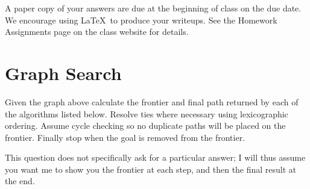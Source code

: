\documentclass[12pt]{article}
\begin{document}

A paper copy of your answers are due at the beginning of class on the due date. We encourage using \LaTeX\ to produce your writeups. See the Homework Assignments page on the class website for details.

\section{Graph Search}

Given the graph above calculate the frontier and final path returned by each of the algorithms listed below. Resolve ties where necessary using lexicographic ordering. Assume cycle checking so no duplicate paths will be placed on the frontier. Finally stop when the goal is removed from the frontier.

\begin{solution}
This question does not specifically ask for a particular answer; I will thus assume you want me to show you the frontier at each step, and then the final result at the end.
\end{solution}
\end{document}
